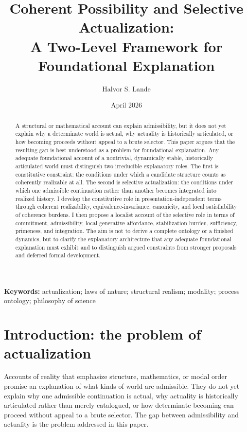 \documentclass[11pt]{article}
\title{\textcolor{titleblue}{\Large Coherent Possibility and Selective Actualization:}\\[0.35em]\textcolor{titleblue}{\Large A Two-Level Framework for Foundational Explanation}}
\author{Halvor S. Lande}
\date{April 2026}
\theoremstyle{foundation}
\begin{document}
\maketitle

\begin{abstract}
A structural or mathematical account can explain admissibility, but it does not yet explain why a determinate world is actual, why actuality is historically articulated, or how becoming proceeds without appeal to a brute selector. This paper argues that the resulting gap is best understood as a problem for foundational explanation. Any adequate foundational account of a nontrivial, dynamically stable, historically articulated world must distinguish two irreducible explanatory roles. The first is constitutive constraint: the conditions under which a candidate structure counts as coherently realizable at all. The second is selective actualization: the conditions under which one admissible continuation rather than another becomes integrated into realized history. I develop the constitutive role in presentation-independent terms through coherent realizability, equivalence-invariance, canonicity, and local satisfiability of coherence burdens. I then propose a localist account of the selective role in terms of commitment, admissibility, local generative affordance, stabilization burden, sufficiency, primeness, and integration. The aim is not to derive a complete ontology or a finished dynamics, but to clarify the explanatory architecture that any adequate foundational explanation must exhibit and to distinguish argued constraints from stronger proposals and deferred formal development.
\end{abstract}

\noindent\textbf{Keywords:} actualization; laws of nature; structural realism; modality; process ontology; philosophy of science

\section{Introduction: the problem of actualization}

Accounts of reality that emphasize structure, mathematics, or modal order promise an explanation of what kinds of world are admissible. They do not yet explain why one admissible continuation is actual, why actuality is historically articulated rather than merely catalogued, or how determinate becoming can proceed without appeal to a brute selector. The gap between admissibility and actuality is the problem addressed in this paper.
\end{document}
